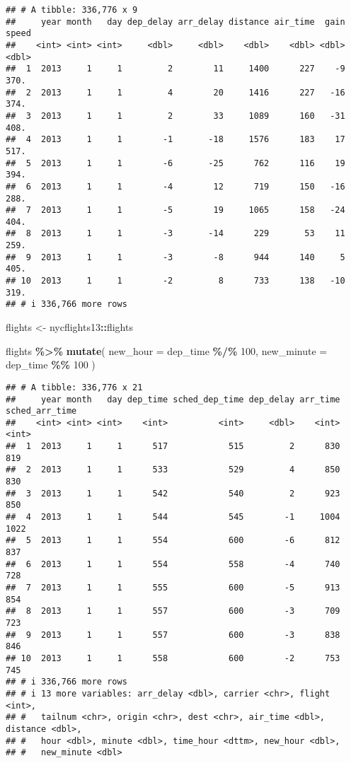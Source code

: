 \documentclass[
]{article}
\newenvironment{Shaded}{\begin{snugshade}}{\end{snugshade}}
\newcommand{\AttributeTok}[1]{\textcolor[rgb]{0.13,0.29,0.53}{#1}}
\newcommand{\DecValTok}[1]{\textcolor[rgb]{0.00,0.00,0.81}{#1}}
\newcommand{\FunctionTok}[1]{\textcolor[rgb]{0.13,0.29,0.53}{\textbf{#1}}}
\newcommand{\NormalTok}[1]{#1}
\newcommand{\OtherTok}[1]{\textcolor[rgb]{0.56,0.35,0.01}{#1}}
\newcommand{\SpecialCharTok}[1]{\textcolor[rgb]{0.81,0.36,0.00}{\textbf{#1}}}
\begin{document}
\begin{verbatim}
## # A tibble: 336,776 x 9
##     year month   day dep_delay arr_delay distance air_time  gain speed
##    <int> <int> <int>     <dbl>     <dbl>    <dbl>    <dbl> <dbl> <dbl>
##  1  2013     1     1         2        11     1400      227    -9  370.
##  2  2013     1     1         4        20     1416      227   -16  374.
##  3  2013     1     1         2        33     1089      160   -31  408.
##  4  2013     1     1        -1       -18     1576      183    17  517.
##  5  2013     1     1        -6       -25      762      116    19  394.
##  6  2013     1     1        -4        12      719      150   -16  288.
##  7  2013     1     1        -5        19     1065      158   -24  404.
##  8  2013     1     1        -3       -14      229       53    11  259.
##  9  2013     1     1        -3        -8      944      140     5  405.
## 10  2013     1     1        -2         8      733      138   -10  319.
## # i 336,766 more rows
\end{verbatim}

\begin{Shaded}
\begin{Highlighting}[]
\NormalTok{flights }\OtherTok{\textless{}{-}}\NormalTok{ nycflights13}\SpecialCharTok{::}\NormalTok{flights}

\NormalTok{flights }\SpecialCharTok{\%\textgreater{}\%} \FunctionTok{mutate}\NormalTok{(}
              \AttributeTok{new\_hour =}\NormalTok{ dep\_time }\SpecialCharTok{\%/\%} \DecValTok{100}\NormalTok{,}
              \AttributeTok{new\_minute =}\NormalTok{ dep\_time }\SpecialCharTok{\%\%} \DecValTok{100}
\NormalTok{            )}
\end{Highlighting}
\end{Shaded}

\begin{verbatim}
## # A tibble: 336,776 x 21
##     year month   day dep_time sched_dep_time dep_delay arr_time sched_arr_time
##    <int> <int> <int>    <int>          <int>     <dbl>    <int>          <int>
##  1  2013     1     1      517            515         2      830            819
##  2  2013     1     1      533            529         4      850            830
##  3  2013     1     1      542            540         2      923            850
##  4  2013     1     1      544            545        -1     1004           1022
##  5  2013     1     1      554            600        -6      812            837
##  6  2013     1     1      554            558        -4      740            728
##  7  2013     1     1      555            600        -5      913            854
##  8  2013     1     1      557            600        -3      709            723
##  9  2013     1     1      557            600        -3      838            846
## 10  2013     1     1      558            600        -2      753            745
## # i 336,766 more rows
## # i 13 more variables: arr_delay <dbl>, carrier <chr>, flight <int>,
## #   tailnum <chr>, origin <chr>, dest <chr>, air_time <dbl>, distance <dbl>,
## #   hour <dbl>, minute <dbl>, time_hour <dttm>, new_hour <dbl>,
## #   new_minute <dbl>
\end{verbatim}
\end{document}
